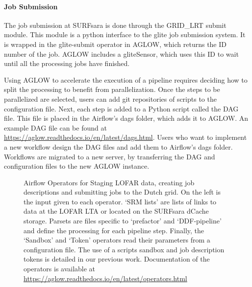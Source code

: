 \paragraph{Job Submission}
The job submission at SURFsara is done through the GRID\_LRT submit module. This module is a python interface to the glite job submission system. It is wrapped in the glite-submit operator in AGLOW, which returns the ID number of the job. AGLOW includes a gliteSensor, which uses this ID to wait until all the processing jobs have finished. 


Using AGLOW to accelerate the execution of a pipeline requires deciding how to split the processing to benefit from parallelization. Once the steps to be parallelized are selected, users can add git repositories of scripts to the configuration file. Next, each step is added to a Python script called the DAG file. This file is placed in the Airflow's dags folder, which adds it to AGLOW. An example DAG file can be found at \url{https://aglow.readthedocs.io/en/latest/dags.html}. Users who want to implement a new workflow design the DAG files and add them to Airflow's dags folder. Workflows are migrated to a new server, by transferring the DAG and configuration files to the new AGLOW instance. 


\begin{figure}[thpb]
 \centering
    \caption[Graphical representation of the Airflow Operators built for AGLOW]{Airflow Operators for Staging LOFAR data, creating job descriptions and submitting jobs to the Dutch grid. On the left is the input given to each operator. `SRM lists' are lists of links to data at the LOFAR LTA or located on the SURFsara dCache storage. Parsets are files specific to `prefactor' and `DDF-pipeline' and define the processing for each pipeline step. Finally, the `Sandbox' and `Token' operators read their parameters from a configuration file. The use of a scripts sandbox and job description tokens is detailed in our previous work\cite{mechev}. Documentation of the operators is available at  \protect\url{https://aglow.readthedocs.io/en/latest/operators.html}}
 \label{AGLOW_Operators}
\end{figure}
 

